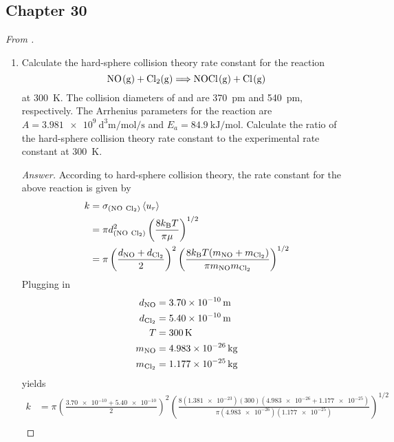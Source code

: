 \documentclass[../psets.tex]{subfiles}
\begin{document}
\subsection*{Chapter 30}
\emph{From \textcite{bib:McQuarrieSimon}.}
\begin{enumerate}[label={\textbf{30-\arabic*.}},leftmargin=3.5em]
    \item Calculate the hard-sphere collision theory rate constant for the reaction
    \begin{equation*}
        \ce{NO(g) + Cl2(g)} \Longrightarrow \ce{NOCl(g) + Cl(g)}
    \end{equation*}
    at \SI{300}{\kelvin}. The collision diameters of  and  are \SI{370}{\pico\meter} and \SI{540}{\pico\meter}, respectively. The Arrhenius parameters for the reaction are $A=\SI{3.981e9}{\cubic\deci\meter\per\mole\per\second}$ and $E_a=\SI{84.9}{\kilo\joule\per\mole}$. Calculate the ratio of the hard-sphere collision theory rate constant to the experimental rate constant at \SI{300}{\kelvin}.
    \begin{proof}[Answer]
        According to hard-sphere collision theory, the rate constant for the above reaction is given by
        \begin{align*}
            k &= \sigma_{(\ce{NO}\ \ce{Cl2})}\prb{u_r}\\
            &= \pi d_{(\ce{NO}\ \ce{Cl2})}^2\left( \frac{8\kB T}{\pi\mu} \right)^{1/2}\\
            &= \pi\left( \frac{d_{\ce{NO}}+d_{\ce{Cl2}}}{2} \right)^2\left( \frac{8\kB T(m_{\ce{NO}}+m_{\ce{Cl2}})}{\pi m_{\ce{NO}}m_{\ce{Cl2}}} \right)^{1/2}
        \end{align*}
        Plugging in
        \begin{align*}
            d_{\ce{NO}} &= \SI{3.70e-10}{\meter}\\
            d_{\ce{Cl2}} &= \SI{5.40e-10}{\meter}\\
            T &= \SI{300}{\kelvin}\\
            m_{\ce{NO}} &= \SI{4.983e-26}{\kilo\gram}\\
            m_{\ce{Cl2}} &= \SI{1.177e-25}{\kilo\gram}
        \end{align*}
        yields
        \begin{align*}
            k &= \pi\left( \frac{\num{3.70e-10}+\num{5.40e-10}}{2} \right)^2\left( \frac{8(\num{1.381e-23})(\num{300})(\num{4.983e-26}+\num{1.177e-25})}{\pi(\num{4.983e-26})(\num{1.177e-25})} \right)^{1/2}\\

\end{align*}
\end{proof}
\end{enumerate}
\end{document}
